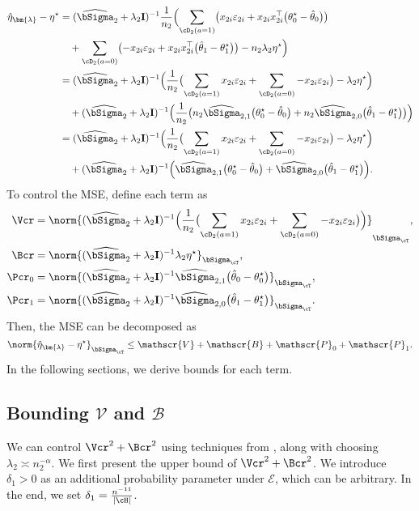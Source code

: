 \documentclass[12pt,a4paper,pdftex,onepage]{article}
\newcommand{\Sighat}{\widehat{{\bSigma}}}
\newcommand{\event}{\mathscr{E}}
\begin{document}
\begin{align*}
\hat{\eta}_{\bm{\lambda}} -\eta^\star 
&= (\Sighat_2 + \lambda_2 \mathbf{I})^{-1} \frac{1}{n_2}\Bigl(\sum_{\cD_2(a=1)} \bigl(x_{2i}\varepsilon_{2i} +x_{2i}x_{2i}^\top\bigl({\theta}^\star_0-\hat{\theta}_0\bigr)\bigr)\\
&\quad +\sum_{\cD_2(a=0)} \bigl(-x_{2i}\varepsilon_{2i}+x_{2i}x_{2i}^\top\bigl(\hat{\theta}_1-{\theta}^\star_1\bigr)\bigr) - n_2\lambda_2 \eta^\star \Bigr) \\
&= (\Sighat_2 + \lambda_2 \mathbf{I})^{-1} \Bigl( \frac{1}{n_2} \bigl(\sum_{\cD_2(a=1)}x_{2i} \varepsilon_{2i}+\sum_{\cD_2(a=0)} -x_{2i}\varepsilon_{2i}\bigr) -\lambda_2 \eta^\star\Bigr)\\
&\quad + (\Sighat_2 + \lambda_2 \mathbf{I})^{-1} \Bigl( \frac{1}{n_2}\bigl( n_2\Sighat_{2,1}\bigl({\theta}^\star_0-\hat{\theta}_0\bigr)
+ n_2\Sighat_{2,0} \bigl(\hat{\theta}_1-{\theta}^\star_1\bigr)\bigr)\Bigr) \\
&= (\Sighat_2 + \lambda_2 \mathbf{I})^{-1} \Bigl( \frac{1}{n_2} \bigl(\sum_{\cD_2(a=1)}x_{2i} \varepsilon_{2i}+\sum_{\cD_2(a=0)} -x_{2i}\varepsilon_{2i}\bigr) -\lambda_2 \eta^\star\Bigr)\\
&\quad + (\Sighat_2 + \lambda_2 \mathbf{I})^{-1} \Bigl( \Sighat_{2,1}\bigl({\theta}^\star_0-\hat{\theta}_0\bigr)
+ \Sighat_{2,0} \bigl(\hat{\theta}_1-{\theta}^\star_1\bigr)\Bigr).
\end{align*}
To control the MSE, define each term as
\begin{align*}
\Vcr &= \norm{(\Sighat_2 + \lambda_2 \mathbf{I})^{-1}\Bigl( \frac{1}{n_2} \bigl(\sum_{\cD_2(a=1)}x_{2i} \varepsilon_{2i}+\sum_{\cD_2(a=0)} -x_{2i}\varepsilon_{2i}\bigr)\Bigr)}_{\bSigma_{\cT}},\\
\Bcr &= \norm{(\Sighat_2 + \lambda_2 \mathbf{I})^{-1}\lambda_2 \eta^\star}_{\bSigma_{\cT}},\\
\Pcr_0 &= \norm{(\Sighat_2 + \lambda_2 \mathbf{I})^{-1} \Sighat_{2,1}\bigl(\hat{\theta}_0-{\theta}^\star_0\bigr)}_{\bSigma_{\cT}},\\
\Pcr_1 &= \norm{(\Sighat_2 + \lambda_2 \mathbf{I})^{-1} \Sighat_{2,0} \bigl(\hat{\theta}_1-{\theta}^\star_1\bigr)}_{\bSigma_{\cT}}.
\end{align*}
Then, the MSE can be decomposed as
\[
\norm{\hat{\eta}_{\bm{\lambda}} -\eta^\star}_{\bSigma_{\cT}} \leq \mathscr{V}+\mathscr{B}+ \mathscr{P}_0 +  \mathscr{P}_1.
\]
In the following sections, we derive bounds for each term.

\subsection{Bounding \(\mathscr{V}\) and \(\mathscr{B}\)}
\noindent
We can control \(\Vcr^2 + \Bcr^2\) using techniques from \citet{wang2023pseudo,ma2023optimally}, along with choosing \(\lambda_2 \asymp n_2^{-\alpha}\).
We first present the upper bound of \(\Vcr^2 + \Bcr^2\).
We introduce \(\delta_1 >0\) as an additional probability parameter under \(\event\), which can be arbitrary. 
In the end, we set \(\delta_1 = \frac{n^{-11}}{|\cH|}\).
\end{document}
